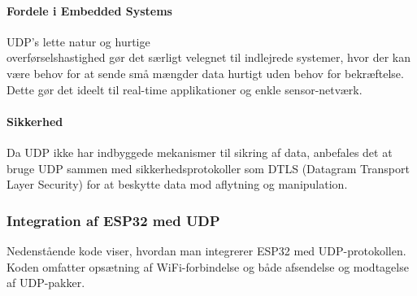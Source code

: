 \paragraph{Fordele i Embedded Systems}
UDP's lette natur og hurtige\\ overførselshastighed gør det særligt velegnet til indlejrede systemer, hvor der kan være behov for at sende små mængder data hurtigt uden behov for bekræftelse. Dette gør det ideelt til real-time applikationer og enkle sensor-netværk.

\paragraph{Sikkerhed}
Da UDP ikke har indbyggede mekanismer til sikring af data, anbefales det at bruge UDP sammen med sikkerhedsprotokoller som DTLS (Datagram Transport Layer Security) for at beskytte data mod aflytning og manipulation.

\subsubsection{Integration af ESP32 med UDP}

Nedenstående kode viser, hvordan man integrerer ESP32 med UDP-protokollen. Koden omfatter opsætning af WiFi-forbindelse og både afsendelse og modtagelse af UDP-pakker.

